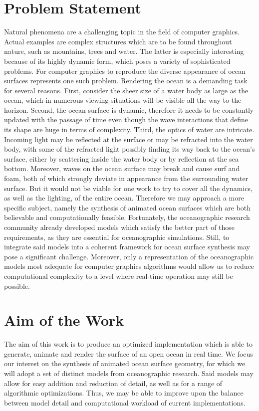 \documentclass[a4paper,11pt,twoside]{memoir}
\begin{document}
\section{Problem Statement}
Natural phenomena are a challenging topic in the field of computer graphics.
Actual examples are complex structures which are to be found throughout nature,
such as mountains, trees and water. The latter is especially interesting
because of its highly dynamic form, which poses a variety of sophisticated problems.
For computer graphics to reproduce the diverse appearance of ocean surfaces
represents one such problem.
Rendering the ocean is a demanding task for several reasons. First, consider the
sheer size of a water body as large as the ocean, which in numerous viewing
situations will be visible all the way to the horizon. Second, the ocean surface
is dynamic, therefore it needs to be constantly updated with the passage of time
even though the wave interactions that define its shape are huge in terms of complexity.
Third, the optics of water are intricate. Incoming light may be reflected at the
surface or may be refracted into the water body, with some of the refracted light
possibly finding its way back to the ocean's surface, either by scattering inside the water
body or by reflection at the sea bottom. Moreover, waves on the ocean surface may
break and cause surf and foam, both of which strongly deviate in appearance from
the surrounding water surface.
But it would not be viable for one work to try to cover all the dynamics, as well
as the lighting, of the entire ocean. Therefore we may approach a more specific
subject, namely the synthesis of animated ocean surfaces which are both believable
and computationally feasible. 
Fortunately, the oceanographic research community already developed models
\citep[e.g.\ ][]{article:PiersonMoskowitz1964, article:Hasselman1973} which satisfy the
better part of those requirements, as they are essential for oceanographic simulations.
Still, to integrate said models into a coherent framework for ocean surface
synthesis may pose a significant challenge.
Moreover, only a representation of the oceanographic models most adequate for
computer graphics algorithms would allow us to reduce computational complexity to
a level where real-time operation may still be possible.
\section{Aim of the Work}
The aim of this work is to produce an optimized implementation which is able to generate,
animate and render the surface of an open ocean in real time. We focus our interest
on the synthesis of animated ocean surface geometry, for which we will adopt
a set of distinct models from oceanographic research. Said models may allow for
easy addition and reduction of detail, as well as for a range of algorithmic
optimizations. Thus, we may be able to improve upon the balance between model detail
and computational workload of current implementations.
%
\end{document}
